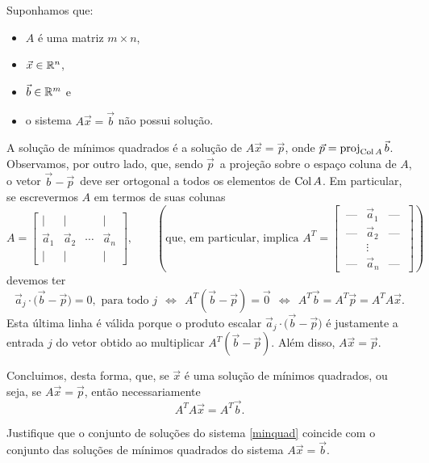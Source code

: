 \documentclass[../livro.tex]{subfiles}  %
\begin{document}
Suponhamos que:
\begin{itemize}
\item $A$ é uma matriz $m \times n$,
\item $\vec{x} \in \mathbb{R}^n$,
\item $\vec{b} \in \mathbb{R}^m$ e
\item o sistema $A \vec{x} = \vec{b}$ não possui solução.
\end{itemize} A solução de mínimos quadrados é a solução de $A \vec{x} = \vec{p}$, onde $\vec{p} = \operatorname{proj}_{\operatorname{Col} A} \vec{b}$. Observamos, por outro lado, que, sendo $\vec{p}\,$ a projeção sobre o espaço coluna de $A$, o vetor $\vec{b} - \vec{p}\,$ deve ser ortogonal a todos os elementos de $\operatorname{Col} A$. Em particular, se escrevermos $A$ em termos de suas colunas
\begin{equation}
A =
\begin{bmatrix}
  | & | &   & | \\
  \vec{a}_1 & \vec{a}_2 & \cdots  & \vec{a}_n \\
  | & | &   & |
\end{bmatrix}, \qquad \left( \text{que,  em particular, implica }
  A^T = \begin{bmatrix}
    \ \text{---} & \vec{a}_1  & \text{---} \ \\
    \ \text{---} & \vec{a}_2  & \text{---} \ \\
    \ & \vdots     &  \ \\
    \ \text{---} & \vec{a}_n  & \text{---}\ 
  \end{bmatrix}\right)
\end{equation} devemos ter
\begin{equation}
\vec{a}_j \cdot \big(\vec{b} - \vec{p}\big) = 0, \text{ para todo } j  \ \  \iff \ \
A^T (\vec{b} - \vec{p}) = \vec{0} \ \ \iff \ \ A^T \vec{b} = A^T \vec{p} = A^T A\vec{x}.
\end{equation} Esta última linha é válida porque o produto escalar $\vec{a}_j \cdot \big(\vec{b} - \vec{p}\big)$ é justamente a entrada $j$ do vetor obtido ao multiplicar $A^T(\vec{b} - \vec{p})$. Além disso, $A \vec{x} = \vec{p}.$

Concluimos, desta forma, que, se $\vec{x}$ é uma solução de mínimos quadrados, ou seja, se $A \vec{x} = \vec{p}$, então necessariamente
\begin{equation}\label{minquad}
  \boxed{A^T A\vec{x} = A^T \vec{b}.}
\end{equation}

\begin{exercise}[Teórico]
  Justifique que o conjunto de soluções do sistema \eqref{minquad} coincide com o conjunto das soluções de mínimos quadrados do sistema $A \vec{x} = \vec{b}$.
\end{exercise}
\end{document}
